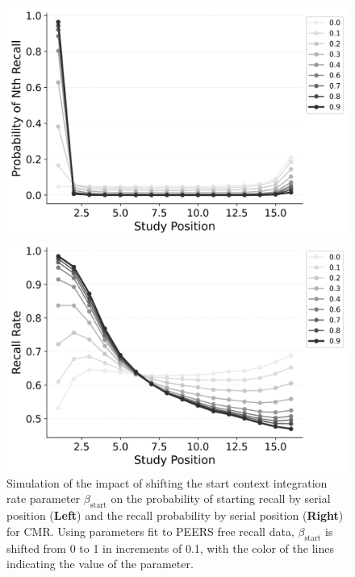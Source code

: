\documentclass[
  man,
  floatsintext,
  longtable,
  nolmodern,
  notxfonts,
  notimes,
  draftfirst,
  colorlinks=true,linkcolor=blue,citecolor=blue,urlcolor=blue]{apa7}
\begin{document}
\begin{figure}

\caption{\label{fig-shiftstart}Simulation of the impact of shifting the
start context integration rate parameter \(\beta_\text{start}\) on the
probability of starting recall by serial position (\textbf{Left}) and
the recall probability by serial position (\textbf{Right}) for CMR.
Using parameters fit to PEERS free recall data, \(\beta_\text{start}\)
is shifted from 0 to 1 in increments of 0.1, with the color of the lines
indicating the value of the parameter.}

\begin{minipage}{0.50\linewidth}
\includegraphics{shifting/bw_BaseCMR_Start_Drift_Rate_Parameter_Shifting_pnr_HealeyKahana2014.png}\end{minipage}%
%
\begin{minipage}{0.50\linewidth}
\includegraphics{shifting/bw_BaseCMR_Start_Drift_Rate_Parameter_Shifting_spc_HealeyKahana2014.png}\end{minipage}%

\end{figure}%
\end{document}
